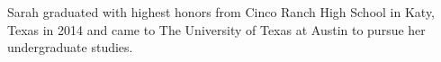 Sarah graduated with highest honors from Cinco Ranch High School in Katy, Texas in 2014 and came to The University of Texas at Austin to pursue her undergraduate studies.

